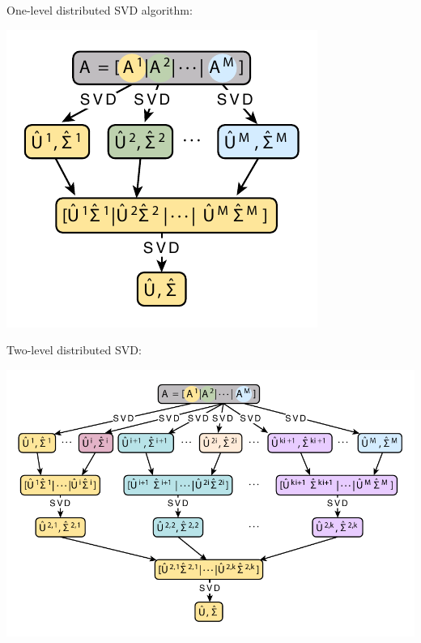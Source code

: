 \documentclass[a0,landscape]{a0poster}
\begin{document}
\begin{multicols}{4}
One-level distributed SVD algorithm:
\begin{center}
  \includegraphics[width=0.55\linewidth]{figures/tikz_one_level_flowchart}
\end{center}\vspace{1cm}

Two-level distributed SVD:
\begin{center}
  \includegraphics[width=1.05\linewidth]{figures/tikz_two_level_flowchart}
\end{center}\vspace{1cm}


\end{multicols}
\end{document}
